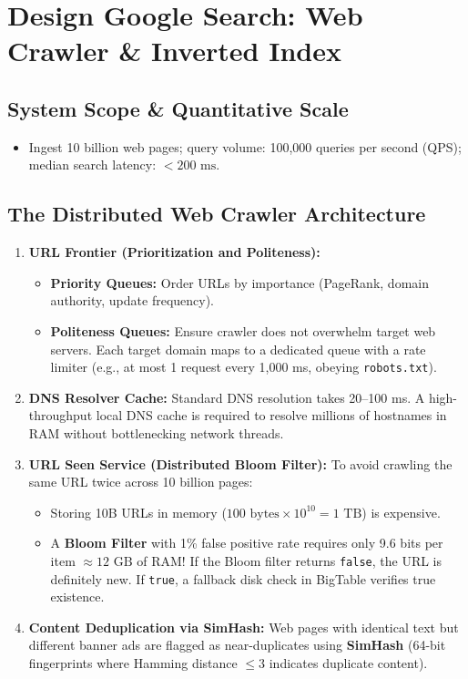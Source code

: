 \documentclass[10pt,journal,compsoc,onecolumn]{IEEEtran}
\begin{document}
\section{Design Google Search: Web Crawler \& Inverted Index}
\label{sec:google_search}

\subsection{System Scope \& Quantitative Scale}
\begin{itemize}
    \item Ingest 10 billion web pages; query volume: 100,000 queries per second (QPS); median search latency: $< 200\text{ ms}$.
\end{itemize}

\subsection{The Distributed Web Crawler Architecture}
\begin{enumerate}
    \item \textbf{URL Frontier (Prioritization and Politeness):}
    \begin{itemize}
        \item \textbf{Priority Queues:} Order URLs by importance (PageRank, domain authority, update frequency).
        \item \textbf{Politeness Queues:} Ensure crawler does not overwhelm target web servers. Each target domain maps to a dedicated queue with a rate limiter (e.g., at most 1 request every 1,000 ms, obeying \texttt{robots.txt}).
    \end{itemize}
    \item \textbf{DNS Resolver Cache:} Standard DNS resolution takes 20--100 ms. A high-throughput local DNS cache is required to resolve millions of hostnames in RAM without bottlenecking network threads.
    \item \textbf{URL Seen Service (Distributed Bloom Filter):} To avoid crawling the same URL twice across 10 billion pages:
    \begin{itemize}
        \item Storing 10B URLs in memory ($100\text{ bytes} \times 10^{10} = 1\text{ TB}$) is expensive.
        \item A \textbf{Bloom Filter} with 1\% false positive rate requires only 9.6 bits per item $\approx 12\text{ GB}$ of RAM! If the Bloom filter returns \texttt{false}, the URL is definitely new. If \texttt{true}, a fallback disk check in BigTable verifies true existence.
    \end{itemize}
    \item \textbf{Content Deduplication via SimHash:} Web pages with identical text but different banner ads are flagged as near-duplicates using \textbf{SimHash} (64-bit fingerprints where Hamming distance $\le 3$ indicates duplicate content).
\end{enumerate}
\end{document}
